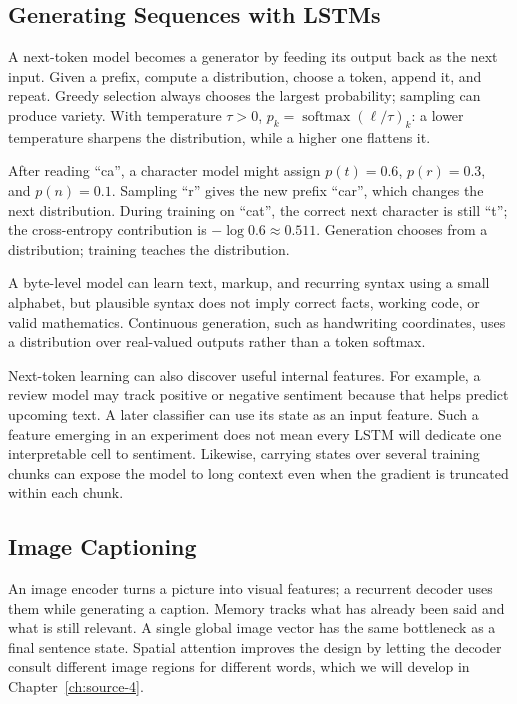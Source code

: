 \documentclass[11pt, oneside]{book}
\DeclareMathOperator{\softmax}{softmax}
\let\originalsubsection\subsection
\renewcommand{\subsection}{\Needspace{6\baselineskip}\originalsubsection}
\begin{document}
\subsection{Generating Sequences with LSTMs}\label{sec:source-3-5-2}
A next-token model becomes a generator by feeding its output back as the next input. Given a prefix, compute a distribution, choose a token, append it, and repeat. Greedy selection always chooses the largest probability; sampling can produce variety. With temperature $\tau>0$, $p_k=\softmax(\boldsymbol{\ell}/\tau)_k$: a lower temperature sharpens the distribution, while a higher one flattens it.

\begin{exbox}[title={Prediction and generation use the same model}]
After reading ``ca'', a character model might assign $p(t)=0.6$, $p(r)=0.3$, and $p(n)=0.1$. Sampling ``r'' gives the new prefix ``car'', which changes the next distribution. During training on ``cat'', the correct next character is still ``t''; the cross-entropy contribution is $-\log0.6\approx0.511$. Generation chooses from a distribution; training teaches the distribution.
\end{exbox}

A byte-level model can learn text, markup, and recurring syntax using a small alphabet, but plausible syntax does not imply correct facts, working code, or valid mathematics. Continuous generation, such as handwriting coordinates, uses a distribution over real-valued outputs rather than a token softmax.

Next-token learning can also discover useful internal features. For example, a review model may track positive or negative sentiment because that helps predict upcoming text. A later classifier can use its state as an input feature. Such a feature emerging in an experiment does not mean every LSTM will dedicate one interpretable cell to sentiment. Likewise, carrying states over several training chunks can expose the model to long context even when the gradient is truncated within each chunk.

\subsection{Image Captioning}\label{sec:source-3-5-3}
An image encoder turns a picture into visual features; a recurrent decoder uses them while generating a caption. Memory tracks what has already been said and what is still relevant. A single global image vector has the same bottleneck as a final sentence state. Spatial attention improves the design by letting the decoder consult different image regions for different words, which we will develop in Chapter~\ref{ch:source-4}.
\end{document}
